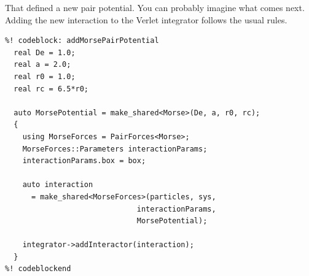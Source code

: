 That defined a new pair potential. You can probably imagine what comes next.
Adding the new interaction to the Verlet integrator follows the usual rules.
\begin{lstlisting}
%! codeblock: addMorsePairPotential
  real De = 1.0;
  real a = 2.0;
  real r0 = 1.0;
  real rc = 6.5*r0;

  auto MorsePotential = make_shared<Morse>(De, a, r0, rc);
  {
    using MorseForces = PairForces<Morse>;
    MorseForces::Parameters interactionParams;
    interactionParams.box = box;

    auto interaction
      = make_shared<MorseForces>(particles, sys,
                              interactionParams,
                              MorsePotential);

    integrator->addInteractor(interaction);
  }
%! codeblockend
\end{lstlisting}

